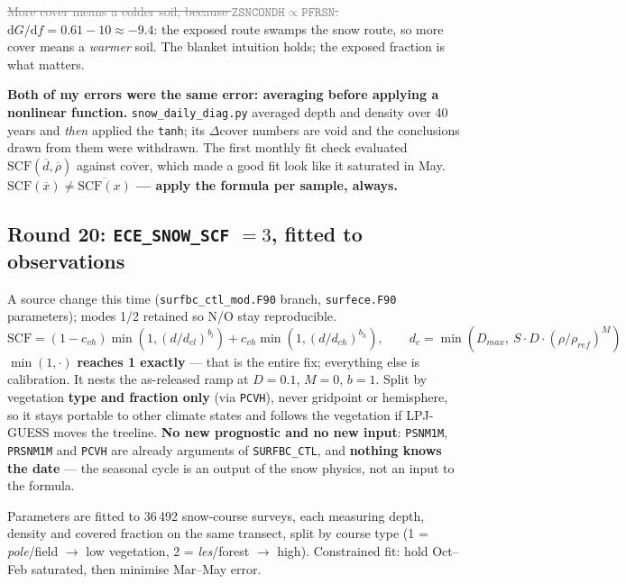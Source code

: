 \documentclass[10pt]{article}
\newcommand{\dead}[1]{\textcolor{gray}{\sout{#1}}}
\begin{document}
\dead{More cover means a colder soil, because $\mathtt{ZSNCONDH}\propto\mathtt{PFRSN}$.}
$\mathrm{d}G/\mathrm{d}f = 0.61-10\approx-9.4$: the exposed route swamps the snow route, so
more cover means a \emph{warmer} soil. The blanket intuition holds; the exposed fraction is
what matters.

\noindent\textbf{Both of my errors were the same error: averaging before applying a nonlinear
function.} \texttt{snow\_daily\_diag.py} averaged depth and density over 40 years and
\emph{then} applied the \texttt{tanh}; its $\Delta$cover numbers are void and the conclusions
drawn from them were withdrawn. The first monthly fit check evaluated
$\mathrm{SCF}(\overline{d},\overline{\rho})$ against $\overline{\mathrm{cover}}$, which made a
good fit look like it saturated in May. \textbf{$\mathrm{SCF}(\overline{x})\neq
\overline{\mathrm{SCF}(x)}$ --- apply the formula per sample, always.}

\subsection{Round 20: \texttt{ECE\_SNOW\_SCF} $=3$, fitted to observations}\label{sub:r20fit}
A source change this time (\texttt{surfbc\_ctl\_mod.F90} branch, \texttt{surfece.F90}
parameters); modes 1/2 retained so N/O stay reproducible.
\[
\mathrm{SCF} = (1-c_{vh})\min\!\left(1,(d/d_{cl})^{b_l}\right)
             + c_{vh}\min\!\left(1,(d/d_{ch})^{b_h}\right),\qquad
d_c = \min\!\left(D_{max},\ S\cdot D\cdot(\rho/\rho_{ref})^{M}\right)
\]
$\min(1,\cdot)$ \textbf{reaches 1 exactly} --- that is the entire fix; everything else is
calibration. It nests the as-released ramp at $D=0.1$, $M=0$, $b=1$. Split by vegetation
\textbf{type and fraction only} (via \texttt{PCVH}), never gridpoint or hemisphere, so it stays
portable to other climate states and follows the vegetation if LPJ-GUESS moves the treeline.
\textbf{No new prognostic and no new input}: \texttt{PSNM1M}, \texttt{PRSNM1M} and
\texttt{PCVH} are already arguments of \texttt{SURFBC\_CTL}, and \textbf{nothing knows the
date} --- the seasonal cycle is an output of the snow physics, not an input to the formula.

Parameters are fitted to 36\,492 snow-course surveys, each measuring depth, density and covered
fraction on the same transect, split by course type (1 = \emph{pole}/field $\to$ low
vegetation, 2 = \emph{les}/forest $\to$ high). Constrained fit: hold Oct--Feb saturated, then
minimise Mar--May error.
\end{document}
